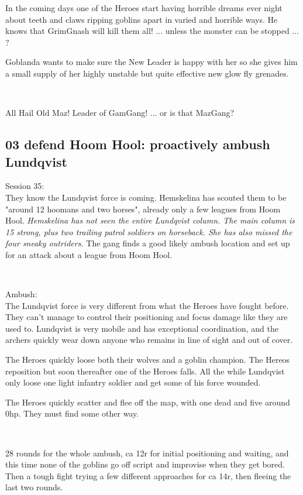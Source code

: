In the coming days one of the Heroes start having horrible dreams ever night about teeth and claws ripping goblins apart in varied and horrible ways. He knows that GrimGnash will kill them all! ... unless the monster can be stopped ... ?

Goblanda wants to make sure the New Leader is happy with her so she gives him a small supply of her highly unstable but quite effective new glow fly grenades.

\

\noindent All Hail Old Maz! Leader of GamGang! ... or is that MazGang?


\subsection*{03 defend Hoom Hool: proactively ambush Lundqvist}

\forceindent Session 35:\\                                              %
They know the Lundqvist force is coming. Hemskelina has scouted them to be "around 12 hoomans and two horses", already only a few leagues from Hoom Hool.
\emph{Hemskelina has not seen the entire Lundqvist column. The main column is 15 strong, plus two trailing patrol soldiers on horseback. She has also missed the four sneaky outriders.}
The gang finds a good likely ambush location and set up for an attack about a league from Hoom Hool.

\

Ambush:\\
The Lundqvist force is very different from what the Heroes have fought before. They can't manage to control their positioning and focus damage like they are used to. Lundqvist is very mobile and has exceptional coordination, and the archers quickly wear down anyone who remains in line of sight and out of cover. 

The Heroes quickly loose both their wolves and a goblin champion. The Hereos reposition but soon thereafter one of the Heroes falls. All the while Lundqvist only loose one light infantry soldier and get some of his force wounded.

The Heroes quickly scatter and flee off the map, with one dead and five around 0hp. They must find some other way.

\

28 rounds for the whole ambush, ca 12r for initial positioning and waiting, and this time none of the goblins go off script and improvise when they get bored. Then a tough fight trying a few different approaches for ca 14r, then fleeing the last two rounds.


